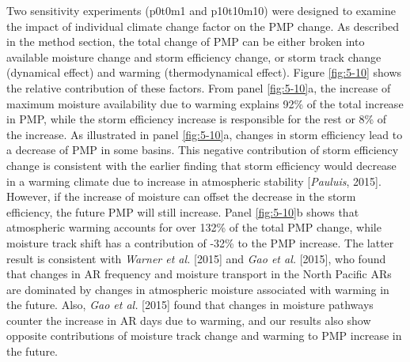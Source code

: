 Two sensitivity experiments (p0t0m1 and p10t10m10) were designed to examine the impact of individual climate change factor on the PMP change. As described in the method section, the total change of PMP can be either broken into available moisture change and storm efficiency change, or storm track change (dynamical effect) and warming (thermodynamical effect). Figure \ref{fig:5-10} shows the relative contribution of these factors. From panel \ref{fig:5-10}a, the increase of maximum moisture availability due to warming explains 92\% of the total increase in PMP, while the storm efficiency increase is responsible for the rest or 8\% of the increase. As illustrated in panel \ref{fig:5-10}a, changes in storm efficiency lead to a decrease of PMP in some basins. This negative contribution of storm efficiency change is consistent with the earlier finding that storm efficiency would decrease in a warming climate due to increase in atmospheric stability [\textit{Pauluis}, 2015]. However, if the increase of moisture can offset the decrease in the storm efficiency, the future PMP will still increase. Panel \ref{fig:5-10}b shows that atmospheric warming accounts for over 132\% of the total PMP change, while moisture track shift has a contribution of -32\% to the PMP increase. The latter result is consistent with \textit{Warner et al.} [2015] and\textit{ Gao et al.} [2015], who found that changes in AR frequency and moisture transport in the North Pacific ARs are dominated by changes in atmospheric moisture associated with warming in the future. Also, \textit{Gao et al.} [2015] found that changes in moisture pathways counter the increase in AR days due to warming, and our results also show opposite contributions of moisture track change and warming to PMP increase in the future.

